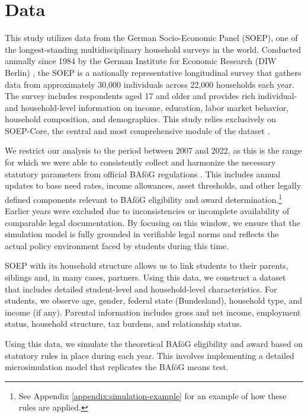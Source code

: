 \section{Data}
This study utilizes data from the German Socio-Economic Panel (SOEP), one of the longest-standing multidisciplinary household surveys in the world. 
Conducted annually since 1984 by the German Institute for Economic Research (DIW Berlin)  \citep{soepcore_v39}, the SOEP is a nationally representative longitudinal survey that gathers data from approximately 30,000 individuals across 22,000 households each year. %
The survey includes respondents aged 17 and older and provides rich individual- and household-level information on income, education, labor market behavior, household composition, and demographics. 
This study relies exclusively on SOEP-Core, the central and most comprehensive module of the dataset \citep{berlin_diw_nodate}.

We restrict our analysis to the period between 2007 and 2022, as this is the range for which we were able to consistently collect and harmonize the necessary statutory parameters from official BAföG regulations \cite{bafoeg_law}. 
This includes annual updates to base need rates, income allowances, asset thresholds, and other legally defined components relevant to BAföG eligibility and award determination.\footnote{
  See Appendix \ref{appendix:simulation-example} for an example of how these rules are applied.
}
Earlier years were excluded due to inconsistencies or incomplete availability of comparable legal documentation. 
By focusing on this window, we ensure that the simulation model is fully grounded in verifiable legal norms and reflects the actual policy environment faced by students during this time.

SOEP with its household structure allows us to link students to their parents, siblings and, in many cases, partners.
Using this data, we construct a dataset that includes detailed student-level and household-level characteristics. 
For students, we observe age, gender, federal state (Bundesland), household type, and income (if any). 
Parental information includes gross and net income, employment status, household structure, tax burdens, and relationship status. 

Using this data, we simulate the theoretical BAföG eligibility and award based on statutory rules in place during each year. 
This involves implementing a detailed microsimulation model that replicates the BAföG means test.

